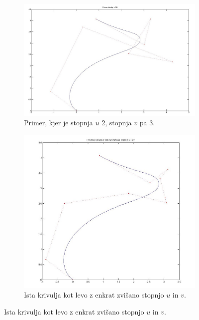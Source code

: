 \documentclass[a4paper]{IEEEtran}
\begin{document}
	\begin{figure}[h]
		\centering
		\begin{subfigure}{.4\textwidth}
			\centering
			\includegraphics[width=\linewidth]{n3m2.jpg}
			\caption{Primer, kjer je stopnja $u$ 2, stopnja $v$ pa 3.}
			\label{fig:n2m3}
		\end{subfigure}%
	
		\begin{subfigure}{.4\textwidth}
			\centering
			\includegraphics[width=\linewidth]{n4m3.jpg}
			\caption{Ista krivulja kot levo z enkrat zvišano stopnjo $u$ in $v$.}
			\label{fig:n3m4}
		\end{subfigure}
		\label{fig:nm}
	\end{figure}
\end{document}
